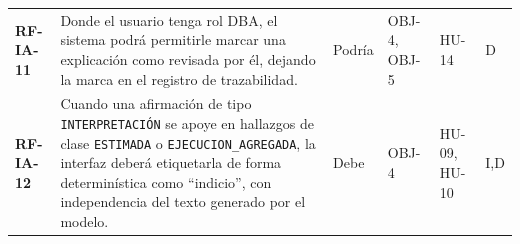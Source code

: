 \documentclass[11pt,a4paper]{report}
\begin{document}
\begin{footnotesize}
\begin{xltabular}{\linewidth}{@{}p{1.7cm}Xp{1.1cm}p{1.3cm}p{1.6cm}p{0.9cm}@{}}
\textbf{RF-IA-11} & Donde el usuario tenga rol DBA, el sistema podrá permitirle marcar una explicación como revisada por él, dejando la marca en el registro de trazabilidad. & Podría & OBJ-4, OBJ-5 & HU-14 & D \\
\textbf{RF-IA-12} & Cuando una afirmación de tipo \texttt{INTERPRETACIÓN} se apoye en hallazgos de clase \texttt{ESTIMADA} o \texttt{EJECUCION\_AGREGADA}, la interfaz deberá etiquetarla de forma determinística como \textquotedblleft indicio\textquotedblright, con independencia del texto generado por el modelo. & Debe & OBJ-4 & HU-09, HU-10 & I,D \\
\end{xltabular}
\end{footnotesize}
\end{document}
